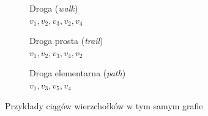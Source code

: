 \newcommand{\drawExampleGraph}{%
  \node[graph vertex] (a) at (0,1.8) {$v_1$};
  \node[graph vertex] (b) at (-1.1,0.7) {$v_2$};
  \node[graph vertex] (c) at (1.1,0.7) {$v_3$};
  \node[graph vertex] (d) at (-1.1,-0.7) {$v_4$};
  \node[graph vertex] (e) at (1.1,-0.7) {$v_5$};
  \draw[draw=black!30,line width=0.5pt] (a)--(b) (a)--(c) (b)--(c);
  \draw[draw=black!30,line width=0.5pt] (b)--(d) (c)--(d) (c)--(e) (d)--(e);
}

\begin{figure}[H]
  \centering
  \begin{subfigure}[t]{0.31\textwidth}
    \centering
    \caption{Droga (\textit{walk})\\[-1mm]
      $v_1,v_2,v_3,v_2,v_4$}
    \label{fig:przyklad-walk}
  \end{subfigure}
  \hfill
  \begin{subfigure}[t]{0.31\textwidth}
    \centering
    \caption{Droga prosta (\textit{trail})\\[-1mm]
      $v_1,v_2,v_3,v_4,v_2$}
    \label{fig:przyklad-trail}
  \end{subfigure}
  \hfill
  \begin{subfigure}[t]{0.31\textwidth}
    \centering
    \caption{Droga elementarna (\textit{path})\\[-1mm]
      $v_1,v_3,v_5,v_4$}
    \label{fig:przyklad-path}
  \end{subfigure}
  \caption{Przykłady ciągów wierzchołków w tym samym grafie}
  \label{fig:przyklady-walk-trail-path}
\end{figure}
